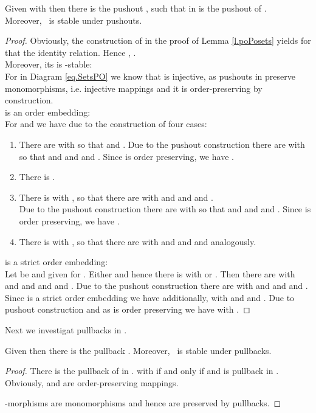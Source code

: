 \begin{lemma}
Given   with  then there is the pushout
	     ,
			   such that in    is the pushout of 
					        .\\
				Moreover,  \M \ is stable under pushouts.
\end{lemma}


\begin{proof}
Obviously, the construction of  in the proof of Lemma \ref{l.poPosets} yields for  that 
 the identity relation. Hence , .\\
Moreover, its is \M-stable:\\
For  in Diagram \ref{eq.SetsPO} we know that  is injective, as pushouts in  preserve monomorphisms, i.e. injective mappings and it is order-preserving by construction. \\
 is an order embedding: \\
For  and  we have due to the construction of  four cases:

\begin{enumerate}
	\item There are  with  so that  and .
	      Due to the pushout construction there are   with  
				  so that  and  and   and . Since  is order preserving, we have .\\					
	\item There is .\\
	\item There is  with , so that there are  with
	        and  and  and .\\
				Due to the pushout construction there are   with  
				  so that  and  and   and .  Since  is order preserving, we have .\\	
	\item There is  with , so that there are  with
	        and  and  and  analogously.	
\end{enumerate}
 is a strict order embedding:\\ 
Let be   and  given for .
Either  and hence there is  with  or .
Then there are  with  and  and   and  and . Due to the pushout construction there are   with   and  and   and . Since  is a strict order embedding we have 
additionally,  with  and  and . Due to pushout construction  and as  is order preserving we have 
with .
\end{proof}

Next we investigat pullbacks in .
\begin{lemma}
Given   then there is the pullback
	     .
				Moreover,  \M \ is stable under pullbacks.
\end{lemma}
\begin{proof}
There is the pullback    of    in .
 with  if and only if  and  is pullback in \cPosets. Obviously,  and  are order-preserving mappings.

 \M-morphisms are monomorphisms and hence are preserved by pullbacks. 
\end{proof}


